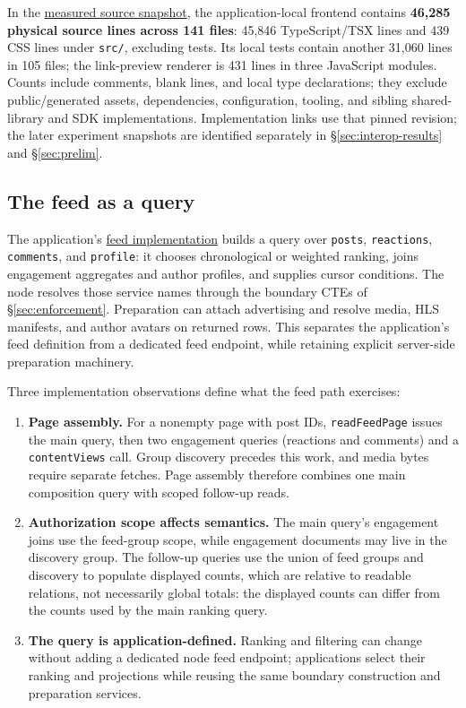 \documentclass[sigconf, nonacm]{acmart}
\newcommand{\artifactbase}{https://github.com/jacoby149/web10}
\newcommand{\artifactrev}{317fa349eae714ddde07f249ca65cdaa34b6459b}
\newcommand{\artifactdir}[2]{\href{\artifactbase/tree/\artifactrev/#1}{#2}}
\newcommand{\artifactfile}[2]{\href{\artifactbase/blob/\artifactrev/#1}{#2}}
\begin{document}
In the \artifactdir{marketing/web10-social/src}{measured source snapshot},
the application-local frontend contains \textbf{46,285 physical source lines
across 141 files}: 45,846 TypeScript/TSX lines and 439 CSS lines under
\texttt{src/}, excluding tests. Its local tests contain another 31,060 lines
in 105 files; the link-preview renderer is 431 lines in three JavaScript
modules. Counts include comments, blank lines, and local type declarations;
they exclude public/generated assets, dependencies, configuration, tooling,
and sibling shared-library and SDK implementations. Implementation links use
that pinned revision; the later experiment snapshots are identified
separately in \S\ref{sec:interop-results} and \S\ref{sec:prelim}.

\subsection{The feed as a query}

The application's
\artifactfile{marketing/web10-social/src/data/feed.ts}{feed implementation}
builds a query over \texttt{posts}, \texttt{reactions}, \texttt{comments},
and \texttt{profile}: it chooses chronological or weighted ranking, joins
engagement aggregates and author profiles, and supplies cursor conditions.
The node resolves those service names through the boundary CTEs of
\S\ref{sec:enforcement}. Preparation can attach advertising and resolve
media, HLS manifests, and author avatars on returned rows. This separates
the application's feed definition from a dedicated feed endpoint, while
retaining explicit server-side preparation machinery.

Three implementation observations define what the feed path exercises:

\begin{enumerate}[leftmargin=*,nosep]
  \item \textbf{Page assembly.} For a nonempty page with post IDs,
  \texttt{readFeedPage} issues the main query, then two engagement queries
  (reactions and comments) and a \texttt{contentViews} call. Group discovery
  precedes this work, and media bytes require separate fetches. Page
  assembly therefore combines one main composition query with scoped
  follow-up reads.
  \item \textbf{Authorization scope affects semantics.} The main query's
  engagement joins use the feed-group scope, while engagement documents may
  live in the discovery group. The follow-up queries use the union of feed
  groups and discovery to populate displayed counts, which are relative to
  readable relations, not necessarily global totals: the displayed counts can
  differ from the counts used by the main ranking query.
  \item \textbf{The query is application-defined.} Ranking and filtering can
  change without adding a dedicated node feed endpoint; applications select
  their ranking and projections while reusing the same boundary
  construction and preparation services.
\end{enumerate}
\end{document}
